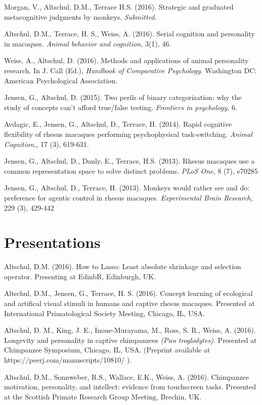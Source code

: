 \documentclass[margin,line]{res}
\begin{document}
\begin{resume}
Morgan, V., Altschul, D.M., Terrace H.S. (2016). Strategic and graduated metacognitive judgments by monkeys.  {\it Submitted.}

Altschul, D.M., Terrace, H. S., Weiss, A. (2016). Serial cognition and personality in macaques. {\it Animal behavior and cognition,} 3(1), 46.

Weiss, A., Altschul, D. (2016). Methods and applications of animal personality research. In J. Call (Ed.), {\it Handbook of Comparative Psychology}. Washington DC: American Psychological Association.

Jensen, G., Altschul, D. (2015). Two perils of binary categorization: why the study of concepts can't afford true/false testing. {\it Frontiers in psychology,} 6.

Avdagic, E., Jensen, G., Altschul, D., Terrace, H. (2014). Rapid cognitive flexibility of rhesus macaques performing psychophysical task-switching. {\it Animal Cognition,}, 17 (3), 619-631.

Jensen, G., Altschul, D., Danly, E., Terrace, H.S. (2013). Rhesus macaques use a common representation space to solve distinct problems. {\it PLoS One,} 8 (7), e70285

Jensen, G., Altschul, D., Terrace, H. (2013). Monkeys would rather see and do: preference for agentic control in rhesus macaques. {\it Experimental Brain Research,} 229 (3), 429-442

\vspace{1.5cm}

\section{\sc Presentations} 

Altschul, D.M. (2016). How to Lasso: Least absolute shrinkage and selection operator. Presenting at EdinbR, Edinburgh, UK.

Altschul, D.M., Jensen, G.,  Terrace, H. S. (2016). Concept learning of ecological and artifical visual stimuli in humans and captive rhesus macaques. Presented at International Primatological Society Meeting, Chicago, IL, USA.

Altschul, D. M., King, J. E., Inoue-Murayama, M., Ross, S. R., Weiss, A. (2016). Longevity and personality in captive chimpanzees {\it (Pan troglodytes)}. Presented at Chimpanzee Symposium, Chicago, IL, USA. (Preprint available at https://peerj.com/manuscripts/10810/ ).

Altschul, D.M., Sonnweber, R.S., Wallace, E.K., Weiss, A. (2016). Chimpanzee motivation, personality, and intellect: evidence from touchscreen tasks. Presented at the Scottish Primate Research Group Meeting, Brechin, UK.


\end{resume}
\end{document}
